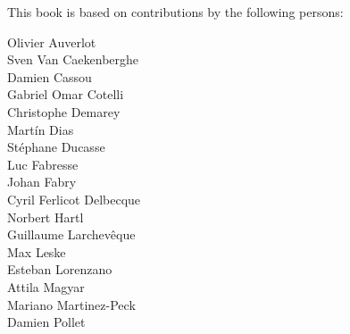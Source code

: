\documentclass[11pt,english]{../support/latex/sbabook/sbabook}
\begin{document}
This book is based on contributions by the following persons:

\small

\begin{multicols}{3}
Olivier Auverlot\\
Sven Van Caekenberghe\\
Damien Cassou\\
Gabriel Omar Cotelli\\
Christophe Demarey\\
Martín Dias\\
Stéphane Ducasse\\
Luc Fabresse\\
Johan Fabry\\
Cyril Ferlicot Delbecque\\
Norbert Hartl\\
Guillaume Larchevêque\\
Max Leske\\
Esteban Lorenzano\\
Attila Magyar\\
Mariano Martinez-Peck\\
Damien Pollet\\
\end{multicols}
\end{document}
